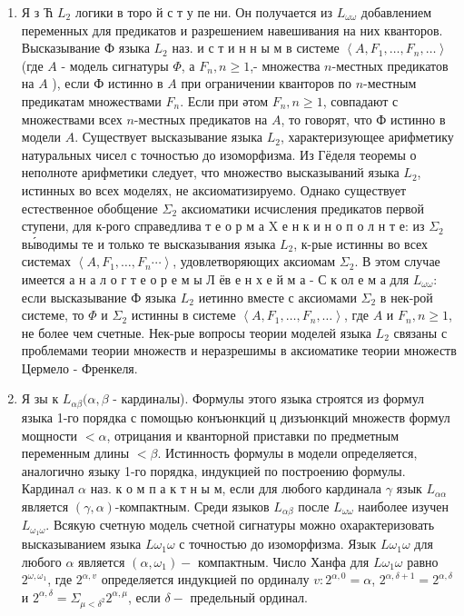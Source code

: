\documentclass[10pt]{article}
\begin{document}
\begin{enumerate}

  \item Я з Ћ $L_{2}$ логики в торо й с т у пе ни. Он получается из $L_{\omega \omega}$ добавлением переменных для предикатов и разрешением навешивания на них кванторов. Высказывание Ф языка $L_{2}$ наз. и с т и н н ы м в системе $\left\langle A, F_{1}, \ldots, F_{n}, \ldots\right\rangle$ (где $A$ - модель сигнатуры $\Phi$, а $F_{n}, n \geqslant 1$,- множества $n$-местных предикатов на $A$ ), если Ф истинно в $A$ при ограничении кванторов по $n$-местным предикатам множествами $F_{n}$. Если при әтом $F_{n}, n \geqslant 1$, совпадают с множествами всех $n$-местных предикатов на $A$, то говорят, что Ф истинно в модели $A$. Существует высказывание языка $L_{2}$, характеризующее арифметику натуральных чисел с точностью до изоморфизма. Из Гёделя теоремы о неполноте арифметики следует, что множество высказываний языка $L_{2}$, истинных во всех моделях, не аксиоматизируемо. Однако существует естественное обобщение $\Sigma_{2}$ аксиоматики исчисления предикатов первой ступени, для к-рого справедлива т е о р м а X е н к и н о п о л н т е: из $\Sigma_{2}$ вы́водимы те и только те высказывания языка $L_{2}$, к-рые истинны во всех системах $\left\langle A, F_{1}, \ldots, F_{n} \cdots\right\rangle$, удовлетворяющих аксиомам $\Sigma_{2}$. В этом случае имеется а н а л о г т е о р е м ы Л ёв е н х е й м а - С к ол е м а для $L_{\omega \omega}:$ если высказывание Ф языка $L_{2}$ иетинно вместе с аксиомами $\Sigma_{2}$ в нек-рой системе, то $\Phi$ и $\Sigma_{2}$ истинны в системе $\left\langle A, F_{1}, \ldots, F_{n}, \ldots\right\rangle$, где $A$ и $F_{n}, n \geqslant 1$, не более чем счетные. Нек-рые вопросы теории моделей языка $L_{2}$ связаны с проблемами теории множеств и неразрешимы в аксиоматике теории множеств Цермело - Френкеля.



  \item Я зы к $L_{\alpha \beta}(\alpha, \beta$ - кардиналы). Формулы этого языка строятся из формул языка 1-го порядка с помощью конъюнкций ц дизъюнкций множеств формул мощности $<\alpha$, отрицания и кванторной приставки по предметным переменным длины $<\beta$. Истинность формулы в модели определяется, аналогично языку 1-го порядка, индукцией по построению формулы. Кардинал $\alpha$ наз. к о м п а к т н ы м, если для любого кардинала $\gamma$ язык $L_{\alpha \alpha}$ является $(\gamma, \alpha)$-компактным. Среди языков $L_{\alpha \beta}$ после $L_{\omega \omega}$ наиболее изучен $L_{\omega_{1} \omega}$. Всякую счетную модель счетной сигнатуры можно охарактеризовать высказыванием языка $L \omega_{1} \omega$ с точностью до изоморфизма. Язык $L \omega_{1} \omega$ для любого $\alpha$ является $\left(\alpha, \omega_{1}\right)-$ компактным. Число Ханфа для $L \omega_{1} \omega$ равно $2^{\omega, \omega_{1}}$, где $2^{\alpha, v}$ определяется индукцией по ординалу $v: 2^{\alpha, 0}=\alpha$, $2^{\alpha, \delta+1}=2^{\alpha, \delta}$ и $2^{\alpha, \delta}=\Sigma_{\mu<\delta^{2}} 2^{\alpha, \mu}$, если $\delta-$ предельный ординал.




\end{enumerate}
\end{document}
